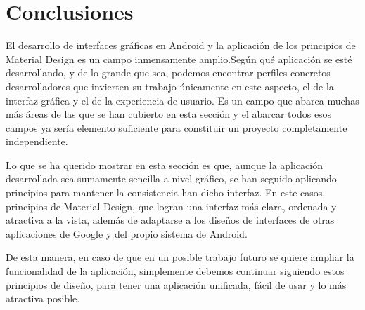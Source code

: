 \section{Conclusiones}

El desarrollo de interfaces gráficas en Android y la aplicación de los principios de Material Design es un campo inmensamente amplio.Según qué aplicación se esté desarrollando, y de lo grande que sea, podemos encontrar perfiles concretos desarrolladores que invierten su trabajo únicamente en este aspecto, el de la interfaz gráfica y el de la experiencia de usuario. Es un campo que abarca muchas más áreas de las que se han cubierto en esta sección y el abarcar todos esos campos ya sería elemento suficiente para constituir un proyecto completamente independiente.

Lo que se ha querido mostrar en esta sección es que, aunque la aplicación desarrollada sea sumamente sencilla a nivel gráfico, se han seguido aplicando principios para mantener la consistencia han dicho interfaz. En este casos, principios de Material Design, que logran una interfaz más clara, ordenada y atractiva a la vista, además de adaptarse a los diseños de interfaces de otras aplicaciones de Google y del propio sistema de Android.

De esta manera, en caso de que en un posible trabajo futuro se quiere ampliar la funcionalidad de la aplicación, simplemente debemos continuar siguiendo estos principios de diseño, para tener una aplicación unificada, fácil de usar y lo más atractiva posible.

